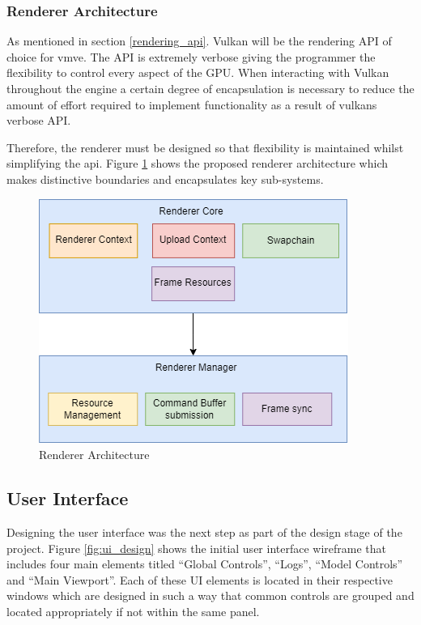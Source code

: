 \documentclass[11pt]{article}
\begin{document}
\subsubsection{Renderer Architecture}
As mentioned in section \ref{rendering_api}. Vulkan will be the rendering API of
choice for \gls*{vmve}. The API is extremely verbose giving the programmer the
flexibility to control every aspect of the GPU. When interacting with Vulkan
throughout the engine a certain degree of encapsulation is necessary to reduce
the amount of effort required to implement functionality as a result of
\glspl*{vulkan} verbose API.

Therefore, the renderer must be designed so that flexibility is maintained
whilst simplifying the \gls{api}. Figure \ref{fig:rendererarch} shows the
proposed renderer architecture which makes distinctive boundaries and
encapsulates key sub-systems.

\begin{figure}[H]
  \centering
  \includegraphics[width=\textwidth]{images/renderer_architecture.png}
  \caption{Renderer Architecture}
  \label{fig:rendererarch}
\end{figure}

\subsection{User Interface}
Designing the user interface was the next step as part of the design stage of
the project. Figure \ref{fig:ui_design} shows the initial user interface
wireframe that includes four main elements titled ``Global Controls'', ``Logs'',
``Model Controls'' and ``Main Viewport''. Each of these UI elements is located
in their respective windows which are designed in such a way that common
controls are grouped and located appropriately if not within the same panel.
\end{document}
